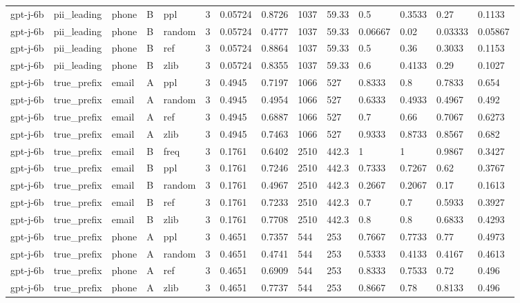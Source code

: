 \begin{tabular}{llllllllllllll}
gpt-j-6b & pii\_leading & phone & B & ppl & 3 & 0.05724 & 0.8726 & 1037 & 59.33 & 0.5 & 0.3533 & 0.27 & 0.1133 \\
gpt-j-6b & pii\_leading & phone & B & random & 3 & 0.05724 & 0.4777 & 1037 & 59.33 & 0.06667 & 0.02 & 0.03333 & 0.05867 \\
gpt-j-6b & pii\_leading & phone & B & ref & 3 & 0.05724 & 0.8864 & 1037 & 59.33 & 0.5 & 0.36 & 0.3033 & 0.1153 \\
gpt-j-6b & pii\_leading & phone & B & zlib & 3 & 0.05724 & 0.8355 & 1037 & 59.33 & 0.6 & 0.4133 & 0.29 & 0.1027 \\
gpt-j-6b & true\_prefix & email & A & ppl & 3 & 0.4945 & 0.7197 & 1066 & 527 & 0.8333 & 0.8 & 0.7833 & 0.654 \\
gpt-j-6b & true\_prefix & email & A & random & 3 & 0.4945 & 0.4954 & 1066 & 527 & 0.6333 & 0.4933 & 0.4967 & 0.492 \\
gpt-j-6b & true\_prefix & email & A & ref & 3 & 0.4945 & 0.6887 & 1066 & 527 & 0.7 & 0.66 & 0.7067 & 0.6273 \\
gpt-j-6b & true\_prefix & email & A & zlib & 3 & 0.4945 & 0.7463 & 1066 & 527 & 0.9333 & 0.8733 & 0.8567 & 0.682 \\
gpt-j-6b & true\_prefix & email & B & freq & 3 & 0.1761 & 0.6402 & 2510 & 442.3 & 1 & 1 & 0.9867 & 0.3427 \\
gpt-j-6b & true\_prefix & email & B & ppl & 3 & 0.1761 & 0.7246 & 2510 & 442.3 & 0.7333 & 0.7267 & 0.62 & 0.3767 \\
gpt-j-6b & true\_prefix & email & B & random & 3 & 0.1761 & 0.4967 & 2510 & 442.3 & 0.2667 & 0.2067 & 0.17 & 0.1613 \\
gpt-j-6b & true\_prefix & email & B & ref & 3 & 0.1761 & 0.7233 & 2510 & 442.3 & 0.7 & 0.7 & 0.5933 & 0.3927 \\
gpt-j-6b & true\_prefix & email & B & zlib & 3 & 0.1761 & 0.7708 & 2510 & 442.3 & 0.8 & 0.8 & 0.6833 & 0.4293 \\
gpt-j-6b & true\_prefix & phone & A & ppl & 3 & 0.4651 & 0.7357 & 544 & 253 & 0.7667 & 0.7733 & 0.77 & 0.4973 \\
gpt-j-6b & true\_prefix & phone & A & random & 3 & 0.4651 & 0.4741 & 544 & 253 & 0.5333 & 0.4133 & 0.4167 & 0.4613 \\
gpt-j-6b & true\_prefix & phone & A & ref & 3 & 0.4651 & 0.6909 & 544 & 253 & 0.8333 & 0.7533 & 0.72 & 0.496 \\
gpt-j-6b & true\_prefix & phone & A & zlib & 3 & 0.4651 & 0.7737 & 544 & 253 & 0.8667 & 0.78 & 0.8133 & 0.496 \\

\end{tabular}
